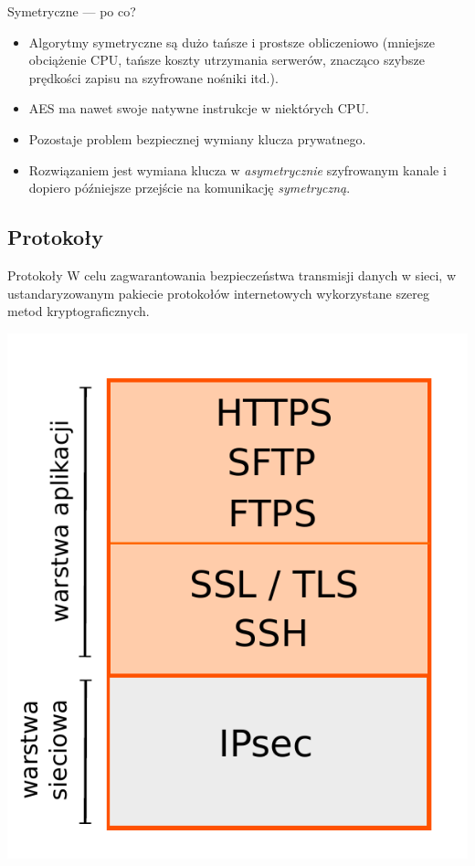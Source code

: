 \begin{frame}{Symetryczne --- po co?}
	\begin{itemize}
		\item Algorytmy symetryczne są dużo tańsze i prostsze obliczeniowo (mniejsze obciążenie CPU, tańsze koszty utrzymania serwerów, znacząco szybsze prędkości zapisu na szyfrowane nośniki itd.).
		\item AES ma nawet swoje natywne instrukcje w niektórych CPU.
		\item Pozostaje problem bezpiecznej wymiany klucza prywatnego.
		\item Rozwiązaniem jest wymiana klucza w \emph{asymetrycznie} szyfrowanym kanale i dopiero późniejsze przejście na komunikację \emph{symetryczną}.
	\end{itemize}
\end{frame}

\subsection{Protokoły}

\begin{frame}{Protokoły}
	W celu zagwarantowania bezpieczeństwa transmisji danych w sieci, w ustandaryzowanym pakiecie protokołów internetowych wykorzystane szereg metod kryptograficznych.
	\begin{center}
		\includegraphics[height=0.4\paperwidth]{images/protocols.pdf}	
	\end{center}

\end{frame}

